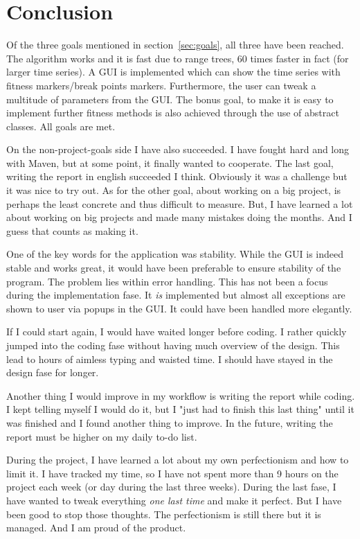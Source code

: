 
\clearpage
\section{Conclusion}

Of the three goals mentioned in section~\ref{sec:goals}, all three have been
reached. The algorithm works and it is fast due to range trees, 60 times faster
in fact (for larger time series). A GUI is
implemented which can show the time series with fitness markers/break points
markers. Furthermore, the user can tweak a multitude of parameters from the GUI.
The bonus goal, to make it is easy to implement further fitness methods is also
achieved through the use of abstract classes. All goals are met. 

On the non-project-goals side I have also succeeded. I have fought hard and long
with Maven, but at some point, it finally wanted to cooperate. The last goal,
writing the report in english succeeded I think. Obviously it was a challenge but
it was nice to try out. As for the other goal, about working on a big project,
is perhaps the least concrete and thus difficult to measure. But, I have learned
a lot about working on big projects and made many mistakes doing the months. And
I guess that counts as making it. 

One of the key words for the application was stability. While the GUI is indeed
stable and works great, it would have been preferable to ensure stability of the
program. The problem lies within error handling. 
This has not been a focus during the implementation fase. It \textit{is}
implemented but almost all exceptions are shown to user via popups in the GUI.
It could have been handled more elegantly. 

If I could start again, I would have waited longer before coding. I rather
quickly jumped into the coding fase without having much overview of the design.
This lead to hours of aimless typing and waisted time. I should have stayed in
the design fase for longer. 

Another thing I would improve in my workflow is writing the report while coding.
I kept telling myself I would do it, but I "just had to finish this last thing"
until it was finished and I found another thing to improve. In the future,
writing the report must be higher on my daily to-do list. 

During the project, I have learned a lot about my own perfectionism and how to
limit it. I have tracked my time, so I have not spent more than 9 hours on the
project each week (or day during the last three weeks). During the last fase, I
have wanted to tweak everything \textit{one last time} and make it perfect. But
I have been good to stop those thoughts. The perfectionism is still there but it
is managed. And I am proud of the product. 